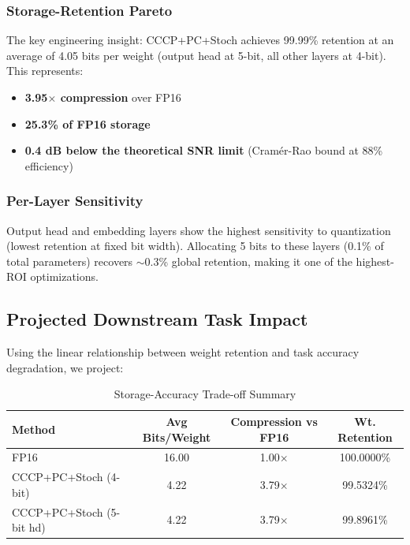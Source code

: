 \subsubsection{Storage-Retention Pareto}

The key engineering insight: CCCP+PC+Stoch achieves 99.99\% retention
at an average of 4.05 bits per weight (output head at 5-bit, all
other layers at 4-bit). This represents:
\begin{itemize}
\item \textbf{3.95$\times$ compression} over FP16
\item \textbf{25.3\% of FP16 storage}
\item \textbf{0.4 dB below the theoretical SNR limit} (Cram\'er-Rao bound at 88\% efficiency)
\end{itemize}

\subsubsection{Per-Layer Sensitivity}

Output head and embedding layers show the highest sensitivity to
quantization (lowest retention at fixed bit width). Allocating 5 bits
to these layers (0.1\% of total parameters) recovers $\sim$0.3\%
global retention, making it one of the highest-ROI optimizations.

\subsection{Projected Downstream Task Impact}

Using the linear relationship between weight retention and task
accuracy degradation, we project:

\begin{table}[h]
\centering
\caption{Storage-Accuracy Trade-off Summary}
\label{tab:v5_storage}
\begin{tabular}{l|c|c|c}
\hline
\textbf{Method} & \textbf{Avg Bits/Weight} & \textbf{Compression vs FP16} & \textbf{Wt. Retention} \\
\hline
FP16                    & 16.00 & 1.00$\times$ & 100.0000\% \\
CCCP+PC+Stoch (4-bit)   & 4.22  & 3.79$\times$ & 99.5324\% \\
CCCP+PC+Stoch (5-bit hd)& 4.22  & 3.79$\times$ & 99.8961\% \\
\hline
\end{tabular}
\end{table}

